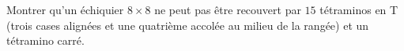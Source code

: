 Montrer qu'un échiquier $8 \times 8$ ne peut pas être recouvert par $15$ tétraminos en T (trois cases alignées et une quatrième accolée au milieu de la rangée) et un tétramino carré.
